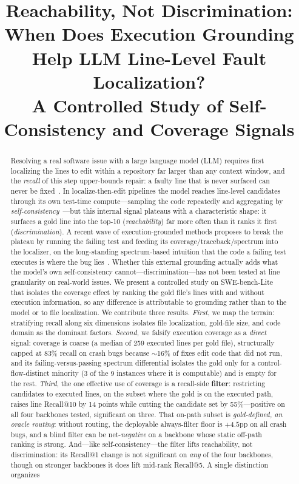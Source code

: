 \documentclass[11pt]{article}
\title{\textbf{Reachability, Not Discrimination: When Does Execution Grounding Help LLM Line-Level Fault Localization?}\\[2pt]
\large A Controlled Study of Self-Consistency and Coverage Signals}
\author{}
\date{}
\begin{document}
\maketitle
\vspace{-3.5em}

\begin{abstract}
\noindent
Resolving a real software issue with a large language model (LLM) requires first localizing the lines to edit within a repository far larger than any context window, and the \emph{recall} of this step upper-bounds repair: a faulty line that is never surfaced can never be fixed~\citep{liu_cannotfix,swebench}. In localize-then-edit pipelines the model reaches line-level candidates through its own test-time compute---sampling the code repeatedly and aggregating by \emph{self-consistency}~\citep{self_consistency}---but this internal signal plateaus with a characteristic shape: it surfaces a gold line into the top-10 (\emph{reachability}) far more often than it ranks it first (\emph{discrimination}). A recent wave of execution-grounded methods proposes to break the plateau by running the failing test and feeding its coverage/traceback/spectrum into the localizer, on the long-standing spectrum-based intuition that the code a failing test executes is where the bug lies~\citep{tarantula,ochiai,wong_survey}. Whether this external grounding actually adds what the model's own self-consistency cannot---discrimination---has not been tested at line granularity on real-world issues. We present a controlled study on SWE-bench-Lite that isolates the coverage effect by ranking the gold file's lines with and without execution information, so any difference is attributable to grounding rather than to the model or to file localization. We contribute three results. \emph{First}, we map the terrain: stratifying recall along six dimensions isolates file localization, gold-file size, and code domain as the dominant factors. \emph{Second}, we falsify execution coverage as a \emph{direct} signal: coverage is coarse (a median of 259 executed lines per gold file), structurally capped at 83\% recall on crash bugs because $\sim$16\% of fixes edit code that did not run, and its failing-versus-passing spectrum differential isolates the gold only for a control-flow-distinct minority (3 of the 9 instances where it is computable) and is empty for the rest. \emph{Third}, the one effective use of coverage is a recall-side \textbf{filter}: restricting candidates to executed lines, on the subset where the gold is on the executed path, raises line Recall@10 by 14 points while cutting the candidate set by 55\%---positive on all four backbones tested, significant on three. That on-path subset is \emph{gold-defined, an oracle routing}: without routing, the deployable always-filter floor is $+4.5$pp on all crash bugs, and a blind filter can be net-\emph{negative} on a backbone whose static off-path ranking is strong. And---like self-consistency---the filter lifts reachability, not discrimination: its Recall@1 change is not significant on \emph{any} of the four backbones, though on stronger backbones it does lift mid-rank Recall@5. A single distinction organizes 
\end{abstract}
\end{document}
